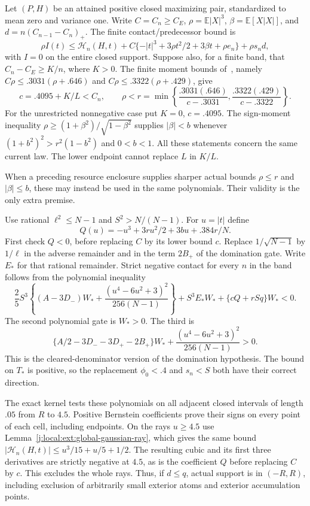 Let $(P,H)$ be an attained positive closed maximizing pair, standardized
to mean zero and variance one. Write $C=C_n\ge C_E$,
$\rho=\mathbb E|X|^3$, $\beta=\mathbb E[X|X|]$, and
$d=n(C_{n-1}-C_n)_+$. The finite contact/predecessor bound is
\[
 \rho I(t)\le\mathcal H_n(H,t)+
 C\{-|t|^3+3\rho t^2/2+3\beta t+\rho e_n\}+\rho s_nd,
\]
with $I=0$ on the entire closed support. Suppose also, for a finite
band, that $C_n-C_E\ge K/n$, where $K>0$. The finite moment bounds of~\cite[p.~125]{Shevtsova2013}, namely
$C\rho\le .3031(\rho+.646)$ and
$C\rho\le .3322(\rho+.429)$, give
\[
 c=.4095+K/L<C_n,\qquad
 \rho<r=\min\left\{\frac{.3031(.646)}{c-.3031},
                        \frac{.3322(.429)}{c-.3322}\right\}.
\]
For the unrestricted nonnegative case put $K=0$, $c=.4095$.
The sign-moment inequality
$\rho\ge(1+\beta^2)/\sqrt{1-\beta^2}$ supplies $|\beta|<b$ whenever
$(1+b^2)^2>r^2(1-b^2)$ and $0<b<1$. All these statements concern the
same current law. The lower endpoint cannot replace $L$ in $K/L$.

When a preceding resource enclosure supplies sharper actual bounds
$\rho\le r$ and $|\beta|\le b$, these may instead be used in the
same polynomials. Their validity is the only extra premise.

Use rational $\ell^2\le N-1$ and $S^2>N/(N-1)$. For $u=|t|$ define
\[
 Q(u)=-u^3+3ru^2/2+3bu+.384r/N.
\]
First check $Q<0$, before replacing $C$ by its lower bound $c$.
Replace $1/\sqrt{N-1}$ by $1/\ell$ in the adverse remainder and in
the term $2B_+$ of the domination gate. Write $E_*$ for that rational
remainder. Strict negative contact for every $n$ in the band follows
from the polynomial inequality
\[
 \frac25S^3\left\{(A-3D_-)W_*+
              \frac{(u^4-6u^2+3)^2}{256(N-1)}\right\}
 +S^3E_*W_*+\{cQ+rSq\}W_*<0.
\]
The second polynomial gate is $W_*>0$. The third is
\[
 \{A/2-3D_--3D_+-2B_+\}W_*+
         \frac{(u^4-6u^2+3)^2}{256(N-1)}>0.
\]
This is the cleared-denominator version of the domination hypothesis.
The bound on $T_*$ is positive, so the replacement $\phi_0<.4$ and
$s_n<S$ both have their correct direction.

The exact kernel tests these polynomials on all adjacent closed intervals
of length $.05$ from $R$ to $4.5$. Positive Bernstein coefficients prove
their signs on every point of each cell, including endpoints. On the
rays $u\ge4.5$ use Lemma~\ref{j:local:ext:global-gaussian-ray}, which gives the same bound
$|\mathcal H_n(H,t)|\le u^3/15+u/5+1/2$.
The resulting cubic and its first three derivatives are strictly negative
at $4.5$, as is the coefficient $Q$ before replacing $C$ by $c$.
This excludes the whole rays. Thus, if $d\le q$, actual support is in
$(-R,R)$, including exclusion of arbitrarily small exterior atoms and
exterior accumulation points.


